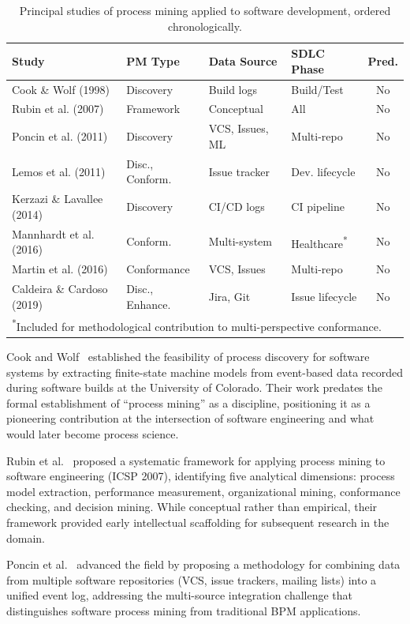 \begin{table}[htb]
\centering
\caption{Principal studies of process mining applied to software
development, ordered chronologically.}
\label{tab:pm-sd}
\begin{tabular}{p{4.0cm}p{2.5cm}p{2.2cm}p{2.0cm}c}
\toprule
\textbf{Study} & \textbf{PM Type} & \textbf{Data Source} &
\textbf{SDLC Phase} & \textbf{Pred.} \\
\midrule
Cook \& Wolf (1998) & Discovery & Build logs & Build/Test & No \\
Rubin et al. (2007) & Framework & Conceptual & All & No \\
Poncin et al. (2011) & Discovery & VCS, Issues, ML & Multi-repo & No \\
Lemos et al. (2011) & Disc., Conform. & Issue tracker & Dev. lifecycle & No \\
Kerzazi \& Lavallee (2014) & Discovery & CI/CD logs & CI pipeline & No \\
Mannhardt et al. (2016) & Conform. & Multi-system & Healthcare\textsuperscript{*} & No \\
Martin et al. (2016) & Conformance & VCS, Issues & Multi-repo & No \\
Caldeira \& Cardoso (2019) & Disc., Enhance. & Jira, Git & Issue lifecycle & No \\
\bottomrule
\multicolumn{5}{l}{\textsuperscript{*}\scriptsize{Included for methodological contribution to multi-perspective conformance.}}
\end{tabular}
\end{table}

Cook and Wolf~\cite{cook1998} established the feasibility of
process discovery for software systems by extracting finite-state machine
models from event-based data recorded during software builds at the
University of Colorado. Their work predates the formal establishment of
``process mining'' as a discipline, positioning it as a pioneering
contribution at the intersection of software engineering and what would
later become process science.

Rubin et al.~\cite{rubin2007} proposed a systematic framework for
applying process mining to software engineering (ICSP 2007), identifying
five analytical dimensions: process model extraction, performance
measurement, organizational mining, conformance checking, and decision
mining. While conceptual rather than empirical, their framework provided
early intellectual scaffolding for subsequent research in the domain.

Poncin et al.~\cite{poncin2011process} advanced the field by proposing
a methodology for combining data from multiple software repositories
(VCS, issue trackers, mailing lists) into a unified event log, addressing
the multi-source integration challenge that distinguishes software process
mining from traditional BPM applications.

